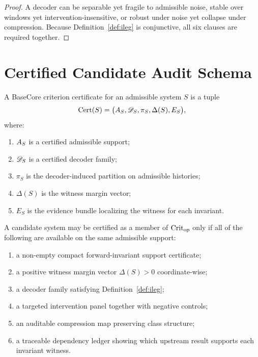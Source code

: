 \begin{proof}
A decoder can be separable yet fragile to admissible noise, stable over windows yet intervention-insensitive, or robust under noise yet collapse under compression. Because Definition~\ref{def:ileg} is conjunctive, all six clauses are required together.
\end{proof}

\section{Certified Candidate Audit Schema}

\begin{definition}\label{def:cert}
A BaseCore criterion certificate for an admissible system $S$ is a tuple
\[
\mathrm{Cert}(S)=\bigl(A_S,\mathscr{D}_S,\pi_S,\Delta(S),E_S\bigr),
\]
where:
\begin{enumerate}[leftmargin=1.5em]
\item $A_S$ is a certified admissible support;
\item $\mathscr{D}_S$ is a certified decoder family;
\item $\pi_S$ is the decoder-induced partition on admissible histories;
\item $\Delta(S)$ is the witness margin vector;
\item $E_S$ is the evidence bundle localizing the witness for each invariant.
\end{enumerate}
\end{definition}

\begin{criterion}\label{crit:cert}
A candidate system may be certified as a member of $\mathrm{Crit}_{\mathrm{op}}$ only if all of the following are available on the same admissible support:
\begin{enumerate}[leftmargin=1.5em]
\item a non-empty compact forward-invariant support certificate;
\item a positive witness margin vector $\Delta(S)>0$ coordinate-wise;
\item a decoder family satisfying Definition~\ref{def:ileg};
\item a targeted intervention panel together with negative controls;
\item an auditable compression map preserving class structure;
\item a traceable dependency ledger showing which upstream result supports each invariant witness.
\end{enumerate}
\end{criterion}


